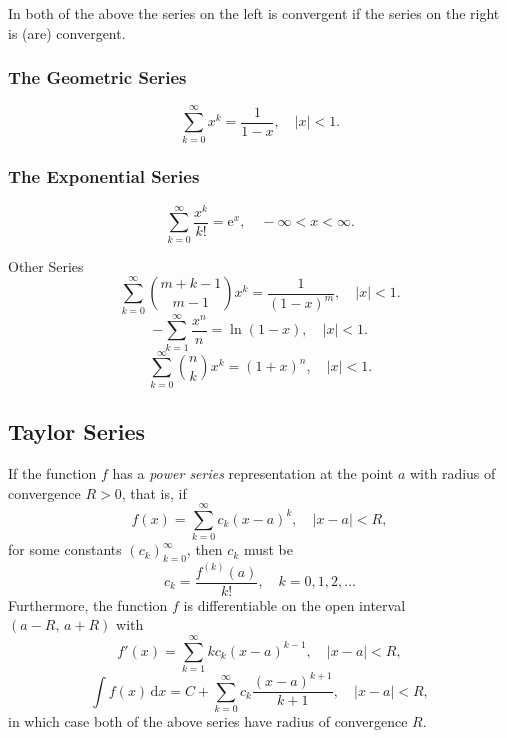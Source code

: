 \documentclass[captions=tableheading]{scrbook}
\begin{document}
\begin{example}
In both of the above the series on the left is convergent if the series on the right is (are) convergent.
\subsubsection{The Geometric Series}
\label{sec-21-3-3-1}

\begin{equation}
\sum_{k=0}^{\infty} x^{k} = \frac{1}{1 - x},\quad |x| < 1.\label{eq-geom-series}
\end{equation}
\subsubsection{The Exponential Series}
\label{sec-21-3-3-2}

\begin{equation}
\sum_{k=0}^{\infty}\frac{x^{k}}{k!} = \mathrm{e}^{x},\quad -\infty < x < \infty. \label{eq-exp-series}
\end{equation}

Other Series
\begin{equation}
\sum_{k=0}^{\infty}{m+k-1 \choose m-1}x^{k}=\frac{1}{(1-x)^{m}},\quad |x|<1.\label{eq-negbin-series}
\end{equation}
\begin{equation}
-\sum_{k=1}^{\infty}\frac{x^{n}}{n}=\ln(1-x),\quad |x| < 1.\label{eq-log-series}
\end{equation}
\begin{equation}
\sum_{k=0}^{\infty}{n \choose k}x^{k}=(1+x)^{n},\quad |x| < 1.\label{eq-binom-series-infinite}
\end{equation}
\subsection{Taylor Series}
\label{sec-21-3-4}


If the function \(f\) has a \emph{power series} representation at the point \(a\) with radius of convergence \(R>0\), that is, if
\begin{equation}
f(x)=\sum_{k=0}^{\infty}c_{k}(x-a)^{k},\quad |x - a| < R,
\end{equation}
for some constants \(\left(c_{k}\right)_{k=0}^{\infty}\), then \(c_{k}\) must be
\begin{equation}
c_{k}=\frac{f^{(k)}(a)}{k!},\quad k=0,1,2,\ldots
\end{equation}
Furthermore, the function \(f\) is differentiable on the open interval \((a-R,\, a+R)\) with
\begin{equation}
f'(x)=\sum_{k=1}^{\infty}kc_{k}(x-a)^{k-1},\quad |x-a| < R,
\end{equation}
\begin{equation}
\int f(x)\,\mathrm{d} x=C+\sum_{k=0}^{\infty}c_{k}\frac{(x-a)^{k+1}}{k+1},\quad |x-a| < R,
\end{equation}
in which case both of the above series have radius of convergence \(R\).

\end{example}
\end{document}
